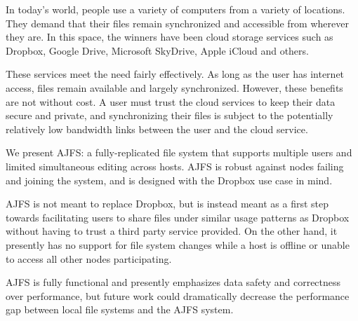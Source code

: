 
In today's world, people use a variety of computers from a variety of locations.
They demand that their files remain synchronized and accessible from wherever
they are. In this space, the winners have been cloud storage services such as
Dropbox, Google Drive, Microsoft SkyDrive, Apple iCloud and others.

These services meet the need fairly effectively. As long as the user has
internet access, files remain available and largely synchronized. However, these
benefits are not without cost. A user must trust the cloud services to keep
their data secure and private, and synchronizing their files is subject to the
potentially relatively low bandwidth links between the user and the cloud
service.

We present AJFS: a fully-replicated file system that supports multiple users and
limited simultaneous editing across hosts. AJFS is robust against nodes failing
and joining the system, and is designed with the Dropbox use case in mind.

AJFS is not meant to replace Dropbox, but is instead meant as a first step
towards facilitating users to share files under similar usage patterns as
Dropbox without having to trust a third party service provided. On the other
hand, it presently has no support for file system changes while a host is
offline or unable to access all other nodes participating.

AJFS is fully functional and presently emphasizes data safety and correctness
over performance, but future work could dramatically decrease the performance
gap between local file systems and the AJFS system.

